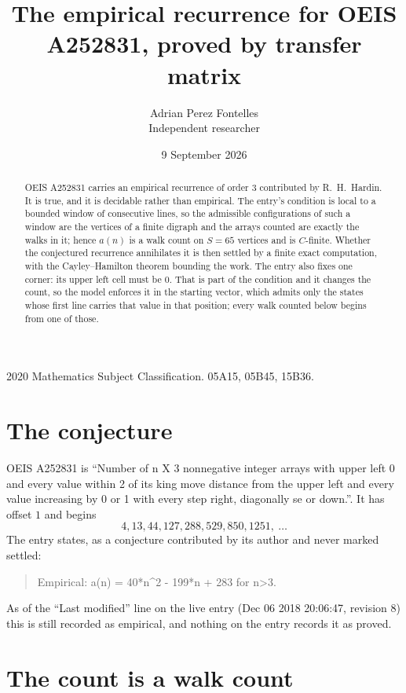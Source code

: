 \documentclass[11pt,a4paper]{article}
\title{The empirical recurrence for OEIS A252831, proved by transfer matrix}
\author{Adrian Perez Fontelles\\ \small Independent researcher}
\date{9 September 2026}
\theoremstyle{plain}
\theoremstyle{definition}
\begin{document}
\maketitle

\begin{abstract}
OEIS A252831 carries an empirical recurrence of order $3$ contributed by R.~H.~Hardin. It is
true, and it is decidable rather than empirical. The entry's condition is local to a bounded window of consecutive lines, so
the admissible configurations of such a window are the vertices of a finite digraph and the
arrays counted are exactly the walks in it; hence $a(n)$ is a walk count on $S=65$ vertices
and is $C$-finite. Whether the conjectured recurrence annihilates it is then settled by a
finite exact computation, with the Cayley--Hamilton theorem bounding the work.
 The entry also fixes one corner: its upper left cell must be $0$. That is part of the condition and it changes the count, so the model enforces it in the starting vector, which admits only the states whose first line carries that value in that position; every walk counted below begins from one of those.\end{abstract}

\noindent\small 2020 Mathematics Subject Classification. 05A15, 05B45, 15B36.\normalsize

\section{The conjecture}

OEIS A252831 is ``Number of n X 3 nonnegative integer arrays with upper left 0 and every value within 2 of its king move distance from the upper left and every value increasing by 0 or 1 with every step right, diagonally se or down.''. It has offset $1$ and begins
\[
4, 13, 44, 127, 288, 529, 850, 1251,\ \dots
\]
The entry states, as a conjecture contributed by its author and never marked settled:
\begin{quote}
Empirical: a(n) = 40*n\^{}2 - 199*n + 283 for n>3.
\end{quote}
As of the ``Last modified'' line on the live entry (Dec 06 2018 20:06:47, revision 8) this is still
recorded as empirical, and nothing on the entry records it as proved.

\section{The count is a walk count}
\end{document}
